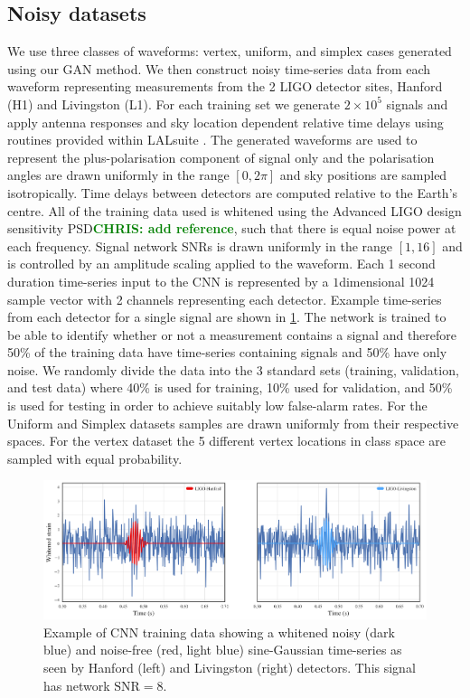\documentclass[12pt]{iopart}
\newcommand{\chris}[1]{\textbf{\textcolor{green}{CHRIS: #1}}}
\newcommand{\ndimensional}[1]{$#1$\nobreakdash\discretionary{-}{-}{-}dimensional}
\begin{document}
\subsection{Noisy datasets} 
We use three classes of waveforms: vertex, uniform, and simplex cases generated using our \ac{GAN} method. We then construct noisy time-series data from each waveform representing measurements from the 2 LIGO detector sites, Hanford (H1) and Livingston (L1). For each training set we generate $2\times 10^5$ signals and apply antenna responses and sky location dependent relative time delays using routines provided within LALsuite \cite{lalsuite}. The generated waveforms are used to represent the plus-polarisation component of signal only and the polarisation angles are drawn uniformly in the range $[0,2\pi]$ and sky positions are sampled isotropically. Time delays between detectors are computed relative to the Earth's centre. All of the training data used is whitened using the Advanced LIGO design sensitivity \ac{PSD}\chris{add reference}, such that there is equal noise power at each frequency. Signal network \acp{SNR} is drawn uniformly in the range $[1,16]$ and is controlled by an amplitude scaling applied to the waveform. Each 1 second duration time-series input to the \ac{CNN} is represented by a \ndimensional{1} 1024 sample vector with 2 channels representing each detector. Example time-series from each detector for a single signal are shown in \cref{fig:cnn_training}. The network is trained to be able to identify whether or not a measurement contains a signal and therefore 50\% of the training data have time-series containing signals and 50\% have only noise. We randomly divide the data into the 3 standard sets (training, validation, and test data) where 40\% is used for training, 10\% used for validation, and 50\% is used for testing in order to achieve suitably low false-alarm rates. For the Uniform and Simplex datasets samples are drawn uniformly from their respective spaces. For the vertex dataset the 5 different vertex locations in class space are sampled with equal probability.  

\begin{figure}[ht!]
    \centering
    \includegraphics[width=\textwidth]{figures/SNR8.png}
    \caption{Example of \ac{CNN} training data showing a whitened noisy (dark blue) and noise-free (red, light blue) sine-Gaussian time-series as seen by Hanford (left) and Livingston (right) detectors. This signal has network $\text{SNR}=8$.}
     \label{fig:cnn_training}
\end{figure}
\end{document}
